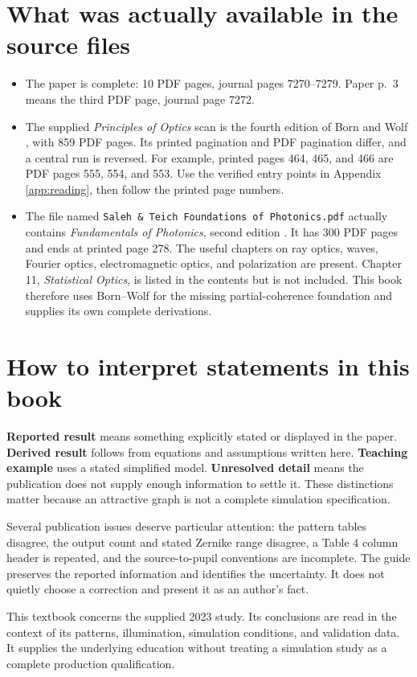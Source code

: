 \section*{What was actually available in the source files}
\begin{itemize}
\item The paper is complete: 10 PDF pages, journal pages 7270--7279.
Paper p.~3 means the third PDF page, journal page 7272.
\item The supplied \emph{Principles of Optics} scan is the fourth edition
of Born and Wolf \cite{bw}, with 859 PDF pages. Its printed pagination
and PDF pagination differ, and a central run is reversed. For example,
printed pages 464, 465, and 466 are PDF pages 555, 554, and 553.
Use the verified entry points in Appendix \ref{app:reading}, then follow
the printed page numbers.
\item The file named \texttt{Saleh \& Teich Foundations of Photonics.pdf}
actually contains \emph{Fundamentals of Photonics}, second edition
\cite{st}. It has 300 PDF pages and ends at printed page 278.
The useful chapters on ray optics, waves, Fourier optics,
electromagnetic optics, and polarization are present. Chapter 11,
\emph{Statistical Optics}, is listed in the contents but is not included.
This book therefore uses Born--Wolf for the missing partial-coherence
foundation and supplies its own complete derivations.
\end{itemize}

\section*{How to interpret statements in this book}
\textbf{Reported result} means something explicitly stated or displayed
in the paper. \textbf{Derived result} follows from equations and assumptions
written here. \textbf{Teaching example} uses a stated simplified model.
\textbf{Unresolved detail} means the publication does not supply enough
information to settle it. These distinctions matter because an attractive
graph is not a complete simulation specification.

Several publication issues deserve particular attention: the pattern tables
disagree, the output count and stated Zernike range disagree, a Table 4
column header is repeated, and the source-to-pupil conventions are incomplete.
The guide preserves the reported information and identifies the uncertainty.
It does not quietly choose a correction and present it as an author's fact.

This textbook concerns the supplied 2023 study. Its conclusions are read
in the context of its patterns, illumination, simulation conditions, and
validation data. It supplies the underlying education without treating a
simulation study as a complete production qualification.
